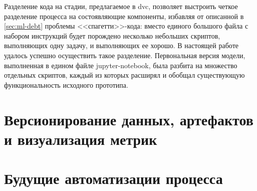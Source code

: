 Разделение кода на стадии, предлагаемое в \gls{dvc}, позволяет выстроить четкое разделение процесса на состоявляющие компоненты, избавляя от описанной в \ref{sec:ml-debt} проблемы <<спагетти>>-кода: вместо единого большого файла с набором инструкций будет порождено несколько небольших скриптов, выполняющих одну задачу, и выполняющих ее хорошо.
В настоящей работе удалось успешно осуществить такое разделение.
Первональная версия модели, выполненная в едином файле \gls{jupyter-notebook}, была разбита на множество отдельных скриптов, каждый из которых расширял и обобщал существующую функциональность исходного прототипа.
\section{Версионирование данных, артефактов и визуализация метрик}
\label{sec:dvc}
\section{Будущие автоматизации процесса}
